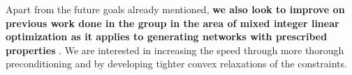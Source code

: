 \documentclass[12pt]{article}
\begin{document}
\begin{spacing}{2}
\indent Apart from the future goals already mentioned, \textbf{we also look to improve on previous work done in the group in the area of mixed integer linear optimization as it applies to generating networks with prescribed properties} \cite{Gounaris2013}. We are interested in increasing the speed through more thorough preconditioning and by developing tighter convex relaxations of the constraints.


\end{spacing}
\end{document}
